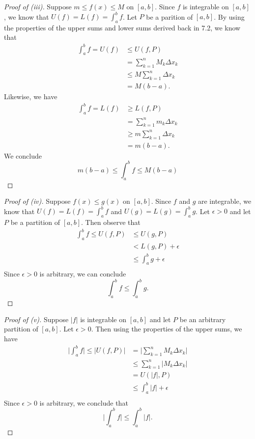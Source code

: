 \begin{proof}[Proof of (iii)]
	Suppose \( m \leq f(x) \leq M  \) on \( [a,b]  \). Since \( f  \) is integrable on \( [a,b]  \), we know that \( U(f) = L(f) = \int_{ a }^{ b } f  \). Let \( P  \) be a parition of \( [a,b] \). By using the properties of the upper sums and lower sums derived back in 7.2, we know that 
	\begin{align*}
	    \int_{ a }^{ b } f = U(f) &\leq U(f,P) \\
			 &= \sum_{ k=1 }^{ n } M_{k } \Delta x_{k } \\
			 &\leq M \sum_{ k=1 }^{ n } \Delta x_{k } \\ 
			 &= M(b-a).
	\end{align*}
	Likewise, we have 
	\begin{align*}
	    \int_{ a }^{ b } f = L(f) &\geq L(f, P) \\
								  &= \sum_{ k=1 }^{ n } m_{k } \Delta x_{k } \\ 
								  &\geq m \sum_{ k=1 }^{ n } \Delta x_{k } \\
								  &= m (b-a).
	\end{align*}
	We conclude 
	\[  m(b-a) \leq \int_{ a }^{ b } f \leq M(b-a) \]
\end{proof}


\begin{proof}[Proof of (iv)]
	Suppose \( f(x) \leq g(x) \) on \( [a,b]  \). Since \( f  \) and \( g \) are integrable, we know that \( U(f) = L(f) = \int_{ a }^{ b } f  \) and \( U(g) = L(g) = \int_{ a }^{ b } g  \). Let \( \epsilon > 0  \) and let \( P  \) be a partition of \( [a,b] \). Then observe that 
	\begin{align*}
		\int_{ a }^{ b } f \leq U(f,P) &\leq U(g, P) \\
									 &< L(g,P) + \epsilon \\ 
									 &\leq \int_{ a }^{ b } g  + \epsilon \\
	\end{align*}
	Since \( \epsilon > 0 \) is arbitrary, we can conclude 
	\[  \int_{ a }^{ b } f \leq \int_{ a }^{ b } g. \]
\end{proof}

\begin{proof}[Proof of (v)]
	Suppose \( | f |  \) is integrable on \( [a,b]  \) and let \( P \) be an arbitrary partition of \( [a,b] \). Let \( \epsilon > 0 \). Then using the properties of the upper sums, we have 
	\begin{align*}
	    \Big| \int_{ a }^{ b } f  \Big| \leq | U(f,P) |
										&= \Big| \sum_{ k=1 }^{ n } M_{k } \Delta x_{k }  \Big| \\
										&\leq \sum_{ k=1 }^{ n } | M_{k } \Delta x_{k } | \\
										&= U(| f |, P) \\
										&\leq \int_{ a }^{ b } | f |   + \epsilon \\
	\end{align*}
	Since \( \epsilon > 0  \) is arbitrary, we conclude that 
	\[  \Big| \int_{ a }^{ b } f  \Big| \leq \int_{ a }^{ b } | f |. \]
\end{proof}

